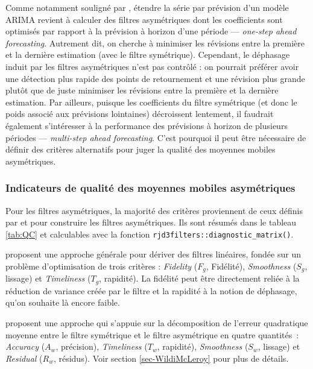 \documentclass[
  12pt,
  a4paper,french]{article}
\newcommand\1{\mathds{1}}
\begin{document}
Comme notamment souligné par \textcite{wildischis2004}, étendre la série par prévision d'un modèle ARIMA revient à calculer des filtres asymétriques dont les coefficients sont optimisés par rapport à la prévision à horizon d'une période --- \emph{one-step ahead forecasting}.
Autrement dit, on cherche à minimiser les révisions entre la première et la dernière estimation (avec le filtre symétrique).
Cependant, le déphasage induit par les filtres asymétriques n'est pas contrôlé : on pourrait préférer avoir une détection plus rapide des points de retournement et une révision plus grande plutôt que de juste minimiser les révisions entre la première et la dernière estimation.
Par ailleurs, puisque les coefficients du filtre symétrique (et donc le poids associé aux prévisions lointaines) décroissent lentement, il faudrait également s'intéresser à la performance des prévisions à horizon de plusieurs périodes --- \emph{multi-step ahead forecasting}.
C'est pourquoi il peut être nécessaire de définir des critères alternatifs pour juger la qualité des moyennes mobiles asymétriques.

\hypertarget{subsec:crit-qual}{%
\subsubsection{Indicateurs de qualité des moyennes mobiles asymétriques}\label{subsec:crit-qual}}

Pour les filtres asymétriques, la majorité des critères proviennent de ceux définis par \textcite{ch15HBSA} et \textcite{trilemmaWMR2019} pour construire les filtres asymétriques.
Ils sont résumés dans le tableau \ref{tab:QC} et calculables avec la fonction \texttt{rjd3filters::diagnostic\_matrix()}.

\textcite{ch15HBSA} proposent une approche générale pour dériver des filtres linéaires, fondée sur un problème d'optimisation de trois critères : \emph{Fidelity} (\(F_g\), Fidélité), \emph{Smoothness} (\(S_g\), lissage) et \emph{Timeliness} (\(T_g\), rapidité).
La fidélité peut être directement reliée à la réduction de variance créée par le filtre et la rapidité à la notion de déphasage, qu'on souhaite là encore faible.

\textcite{trilemmaWMR2019} proposent une approche qui s'appuie sur la décomposition de l'erreur quadratique moyenne entre le filtre symétrique et le filtre asymétrique en quatre quantités~: \emph{Accuracy} (\(A_w\), précision), \emph{Timeliness} (\(T_w\), rapidité), \emph{Smoothness} (\(S_w\), lissage) et \emph{Residual} (\(R_w\), résidus).
Voir section \ref{sec-WildiMcLeroy} pour plus de détails.
\end{document}
